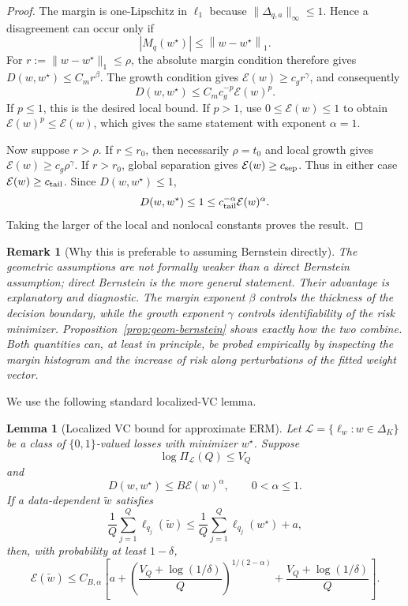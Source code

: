 \documentclass[11pt]{article}
\newtheorem{lemma}{Lemma}
\newtheorem{remark}{Remark}
\newcommand{\wstar}{w^\star}
\newcommand{\norm}[1]{\left\lVert #1\right\rVert}
\begin{document}
\begin{proof}
The margin is one-Lipschitz in $\ell_1$ because $\|\Delta_{q,a}\|_\infty\le1$.  Hence a disagreement can occur only if
\[
|M_q(\wstar)|
\le
\norm{w-\wstar}_1.
\]
For $r:=\|w-\wstar\|_1\le\rho$, the absolute margin condition therefore gives $D(w,\wstar)\le C_m r^\beta$.  The growth condition gives $\mathcal E(w)\ge c_g r^\gamma$, and consequently
\[
D(w,\wstar)
\le
C_m c_g^{-p}\mathcal E(w)^p.
\]
If $p\le1$, this is the desired local bound.  If $p>1$, use $0\le\mathcal E(w)\le1$ to obtain $\mathcal E(w)^p\le\mathcal E(w)$, which gives the same statement with exponent $\alpha=1$.

Now suppose $r>\rho$.  If $r\le r_0$, then necessarily $\rho=t_0$ and local growth gives $\mathcal E(w)\ge c_g\rho^\gamma$.  If $r>r_0$, global separation gives $\mathcal E(w)\ge c_{\rm sep}$.  Thus in either case $\mathcal E(w)\ge c_{\rm tail}$.  Since $D(w,\wstar)\le1$,
\[
D(w,\wstar)
\le
1
\le
c_{\rm tail}^{-\alpha}\mathcal E(w)^\alpha.
\]
Taking the larger of the local and nonlocal constants proves the result.
\end{proof}

\begin{remark}[Why this is preferable to assuming Bernstein directly]
The geometric assumptions are not formally weaker than a direct Bernstein assumption; direct Bernstein is the more general statement.  Their advantage is explanatory and diagnostic.  The margin exponent $\beta$ controls the thickness of the decision boundary, while the growth exponent $\gamma$ controls identifiability of the risk minimizer.  Proposition~\ref{prop:geom-bernstein} shows exactly how the two combine.  Both quantities can, at least in principle, be probed empirically by inspecting the margin histogram and the increase of risk along perturbations of the fitted weight vector.
\end{remark}

We use the following standard localized-VC lemma.

\begin{lemma}[Localized VC bound for approximate ERM]
\label{lem:localized-vc}
Let $\mathcal L=\{\ell_w:w\in\Delta_K\}$ be a class of $\{0,1\}$-valued losses with minimizer $\wstar$.  Suppose
\[
\log\Pi_{\mathcal L}(Q)\le V_Q
\]
and
\[
D(w,\wstar)
\le
B\mathcal E(w)^\alpha,
\qquad 0<\alpha\le1.
\]
If a data-dependent $\widetilde w$ satisfies
\[
\frac1Q\sum_{j=1}^Q\ell_{q_j}(\widetilde w)
\le
\frac1Q\sum_{j=1}^Q\ell_{q_j}(\wstar)+a,
\]
then, with probability at least $1-\delta$,
\[
\mathcal E(\widetilde w)
\le
C_{B,\alpha}
\left[
 a
 +
\left(\frac{V_Q+\log(1/\delta)}{Q}\right)^{1/(2-\alpha)}
+
\frac{V_Q+\log(1/\delta)}{Q}
\right].
\]
\end{lemma}
\end{document}
